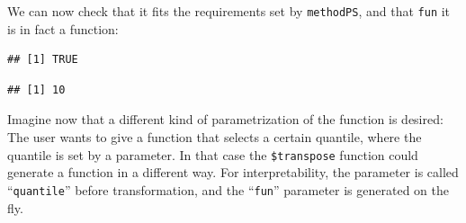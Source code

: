 \documentclass[]{scrbook}
\newenvironment{Shaded}{\begin{snugshade}}{\end{snugshade}}
\newcommand{\CommentTok}[1]{\textcolor[rgb]{0.56,0.35,0.01}{\textit{#1}}}
\newcommand{\ControlFlowTok}[1]{\textcolor[rgb]{0.13,0.29,0.53}{\textbf{#1}}}
\newcommand{\DataTypeTok}[1]{\textcolor[rgb]{0.13,0.29,0.53}{#1}}
\newcommand{\DecValTok}[1]{\textcolor[rgb]{0.00,0.00,0.81}{#1}}
\newcommand{\KeywordTok}[1]{\textcolor[rgb]{0.13,0.29,0.53}{\textbf{#1}}}
\newcommand{\NormalTok}[1]{#1}
\newcommand{\OperatorTok}[1]{\textcolor[rgb]{0.81,0.36,0.00}{\textbf{#1}}}
\newcommand{\StringTok}[1]{\textcolor[rgb]{0.31,0.60,0.02}{#1}}
\renewenvironment{Shaded} {\begin{snugshade}\small} {\end{snugshade}}
\begin{document}
We can now check that it fits the requirements set by \texttt{methodPS}, and that \texttt{fun} it is in fact a function:

\begin{Shaded}
\end{Shaded}

\begin{verbatim}
## [1] TRUE
\end{verbatim}

\begin{Shaded}
\end{Shaded}

\begin{verbatim}
## [1] 10
\end{verbatim}

Imagine now that a different kind of parametrization of the function is desired:
The user wants to give a function that selects a certain quantile, where the quantile is set by a parameter.
In that case the \texttt{\$transpose} function could generate a function in a different way.
For interpretability, the parameter is called ``\texttt{quantile}'' before transformation, and the ``\texttt{fun}'' parameter is generated on the fly.

\begin{Shaded}
\end{Shaded}
\end{document}
